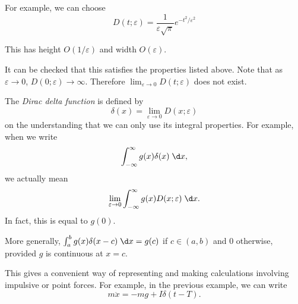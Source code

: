 \documentclass[a4paper]{article}
\begin{document}
For example, we can choose
\[
  D(t; \varepsilon) = \frac{1}{\varepsilon\sqrt{\pi}}e^{-t^2/\varepsilon^2}
\]
\begin{center}
\end{center}
This has height $O(1/\varepsilon)$ and width $O(\varepsilon)$.

It can be checked that this satisfies the properties listed above. Note that as $\varepsilon \to 0$, $D(0; \varepsilon)\to \infty$. Therefore $\displaystyle \lim_{\varepsilon\to 0} D(t; \varepsilon)$ does not exist.

\begin{defi}
  The \emph{Dirac delta function} is defined by
  \[
    \delta(x) = \lim_{\varepsilon \to 0} D(x; \varepsilon)
  \]
  on the understanding that we can only use its integral properties. For example, when we write
  \[
    \int_{-\infty}^{\infty} g(x)\delta (x) \;\d x,
  \]
  we actually mean
  \[
    \lim_{\varepsilon \to 0} \int_{-\infty}^{\infty} g(x)D(x; \varepsilon)\;\d x.
  \]
  In fact, this is equal to $g(0)$.

  More generally, $\int_a^b g(x)\delta(x - c)\;\d x = g(c)$ if $c\in (a, b)$ and $0$ otherwise, provided $g$ is continuous at $x = c$.
\end{defi}

This gives a convenient way of representing and making calculations involving impulsive or point forces. For example, in the previous example, we can write
\[
  m\ddot x = -mg + I\delta(t - T).
\]
\end{document}
